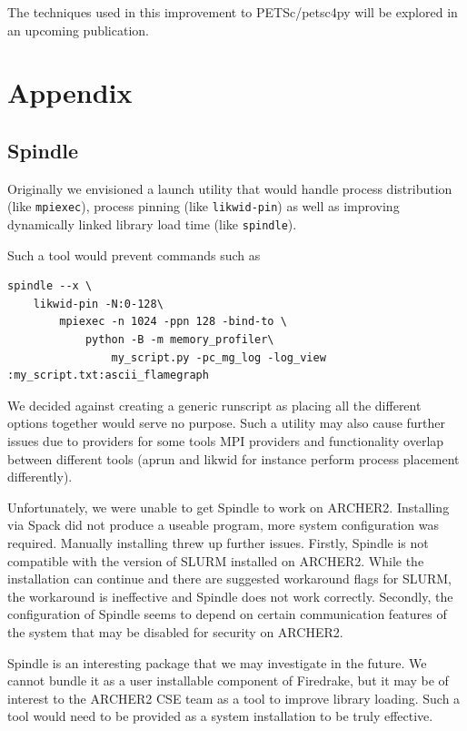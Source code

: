 \documentclass[a4paper,11pt]{article}
\begin{document}
The techniques used in this improvement to PETSc/petsc4py will be explored in an upcoming publication.


\appendix
\section{Appendix}
\label{sec:app}
\subsection{Spindle}
\label{ssec:spindle}
Originally we envisioned a launch utility that would handle process distribution (like \verb`mpiexec`), process pinning (like \verb`likwid-pin`) as well as improving dynamically linked library load time (like \verb`spindle`).

Such a tool would prevent commands such as
\begin{lstlisting}
spindle --x \
    likwid-pin -N:0-128\
        mpiexec -n 1024 -ppn 128 -bind-to \
            python -B -m memory_profiler\
                my_script.py -pc_mg_log -log_view :my_script.txt:ascii_flamegraph
\end{lstlisting}

We decided against creating a generic runscript as placing all the different options together would serve no purpose.
Such a utility may also cause further issues due to providers for some tools MPI providers and functionality overlap between different tools (aprun and likwid for instance perform process placement differently).

Unfortunately, we were unable to get Spindle\cite{spindlepaper,spindleweb} to work on ARCHER2.
Installing via Spack did not produce a useable program, more system configuration was required.
Manually installing threw up further issues.
Firstly, Spindle is not compatible with the version of SLURM installed on ARCHER2.
While the installation can continue and there are suggested workaround flags for SLURM, the workaround is ineffective and Spindle does not work correctly.
Secondly, the configuration of Spindle seems to depend on certain communication features of the system that may be disabled for security on ARCHER2.

Spindle is an interesting package that we may investigate in the future.
We cannot bundle it as a user installable component of Firedrake, but it may be of interest to the ARCHER2 CSE team as a tool to improve library loading.
Such a tool would need to be provided as a system installation to be truly effective.
\end{document}
